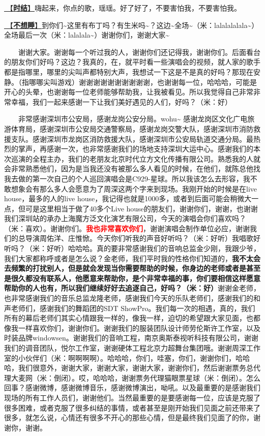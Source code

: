 \documentclass[]{ctexbook}
\begin{document}
\hyperref[shijie]{🎵【\textbf{时结}】}嗨起来，你点的歌，瑶瑶。好了好了，不要害怕我，不要害怕我。

\hyperref[keep-playing]{🎵【\textbf{不想睡}】}到你们\textasciitilde 这里有布丁吗？有生米吗\textasciitilde？这边\textasciitilde 全场\textasciitilde（米：lalalalalala\textasciitilde）全场最后一次（米：lalalala\textasciitilde）谢谢你们，谢谢大家\textasciitilde{}

  谢谢大家。谢谢每一个听过我的人，谢谢你们还记得我，谢谢你们。后面看台的朋友你们好吗？这边？我真的，在，就平时看一些演唱会的视频，就人家的歌手都是指哪里，哪里的尖叫声都特别大声，我想试一下这是不是真的好吗？那现在安静。（指哪哪尖叫游戏）谢谢谢谢谢谢谢谢谢谢，也谢谢每一位，哈哈哈，可能是开心的头晕，也谢谢每一位老师能够帮助我，让我被看见。所以我觉得自己非常非常幸福，我们一起来感谢一下让我们美好遇见的人们，好吗？（米：好）

  非常感谢深圳市公安局，感谢龙岗公安分局。wohu\textasciitilde{} 感谢龙岗区文化广电旅游体育局，感谢深圳市公安局交通警察局，感谢龙岗交警大队，感谢深圳市消防救援支队。感谢深圳市龙岗区消防救援大队，感谢深圳市公安局轨道交通分局。最热烈的掌声，再感谢一次，也非常感谢我们的场地支持深圳大运中心。感谢我们的本次巡演的全程主办，我们的老朋友北京时代立方文化传播有限公司。熟悉我的人就会非常熟悉他们，因为是当我还没有被那么多人看见的时候，在他们，就陈总他找我去做的第一次自己的个人巡回演唱会是C929-星球。所以我该怎么去形容，我不敢想象会有那么多人会愿意为了周深这两个字来到现场。我刚开始的时候是在live house，最多的人的live house，我记得也就是1000多，或者到后面可能会稍微大一点，但可是这里相当于做了40多个Live house的朋友们，谢谢你们，谢谢，也谢谢我们深圳站的承办上海魔方泛文化演艺有限公司，今天的演唱会你们喜欢吗？（米：喜欢）。谢谢你们。\textbf{\textcolor{red}{我也非常喜欢你们}}，谢谢演唱会制作单位必应，谢谢我们的总导演周佑洋、庄惟惞。今天你们听我的声音好听吗？（米：好听）我唱歌好听吗？（米：好听）哈哈哈。真的要非常感谢我们的音响总监金少刚，我跟少爷，我们大家都称呼或者是怎么说？金老师，我们平时我的性格你们知道的，\textbf{我不太会去频繁的打扰别人，但是就会发现当你需要帮助的时候，你身边的老师或者是甚至是很久都没有联系人，他愿意来帮助你，是个非常幸福的事，你们要相信这样愿意帮助你的人也有，所以我们继续好好去追逐自己，好吗？（米：好）}谢谢金老师，也非常感谢我们的音乐总监龙隆老师，感谢我们今天的乐队老师们，感谢我们的和声老师们，感谢我们的舞蹈团的SDT ShowPro。我们每一次的相遇，真的，我们所有的幕后老师们其实心情跟我一样的，像我一样，迫切的希望跟大家见面，也都像我一样喜欢你们，谢谢你们。谢谢我们的服装团队设计师劳伦斯许工作室，以及时装品牌windowsen。谢谢我们的音响工程，南京奥斯泰视听科技有限公司，谢谢我们的调音团队，悦尔工作室，谢谢硬体工程北京力超舞台集团哦。谢谢周深工作室的小伙伴们（米：啊啊啊啊）。哈哈哈，你们，哇塞，你们，谢谢你们，哈哈哈，我们很意外，谢谢大家，谢谢大家，谢谢大家，谢谢你们，然后谢谢票务总代理大麦网（米：倒闭）。哎，哈哈哈，谢谢票务代理猫眼票星球（米：倒闭）。怎么回事？感谢微博，感谢微博音乐，感谢微博演出，呦吼。以及最重要的是感谢我们现场的所有工作人员们，谢谢他们。当然最重要的是要感谢每一位，应该是克服了很多困难，或者克服了很多纠结的事情，或者甚至是刚开始我们见面之前还带来了很多，就怎么说，心情还有很多不开心的那些心情，但是最终我们见面了的你，谢谢你，谢谢。
\end{document}
